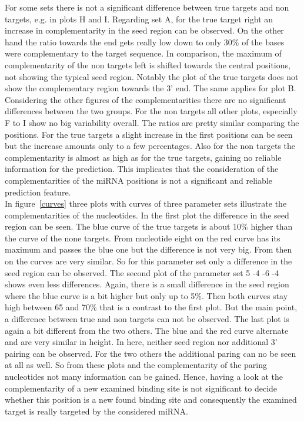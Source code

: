 \documentclass[12pt]{article}
\begin{document}
For some sets there is not a significant difference between true targets and non targets, e.g. in plots H and I. Regarding set A, for the true target right an increase in complementarity in the seed region can be observed. On the other hand the ratio towards the end gets really low down to only 30\% of the bases were complementary to the target sequence. In comparison, the maximum of complementarity of the non targets left is shifted towards the central positions, not showing the typical seed region. Notably the plot of the true targets does not show the complementary region towards the 3' end. The same applies for plot B. Considering the other figures of the complementarities there are no significant differences between the two groups. For the non targets all other plots, especially F to I show no big variability overall. The ratios are pretty similar comparing the positions. For the true targets a slight increase in the first positions can be seen but the increase amounts only to a few percentages.
Also for the non targets the complementarity is almost as high as for the true targets, gaining no reliable information for the prediction. This implicates that the consideration of the complementarities of the miRNA positions is not a significant and reliable prediction feature.\\

In figure~\ref{curves} three plots with curves of three parameter sets illustrate the complementarities of the nucleotides. In the first plot the difference in the seed region can be seen. The blue curve of the true targets is about 10\% higher than the curve of the none targets. From nucleotide eight on the red curve has its maximum and passes the blue one but the difference is not very big. From then on the curves are very similar. So for this parameter set only a difference in the seed region can be observed. 
The second plot of the parameter set 5 -4 -6 -4 shows even less differences. Again, there is a small difference in the seed region where the blue curve is a bit higher but only up to 5\%. Then both curves stay high between 65 and 70\% that is a contrast to the first plot. But the main point, a difference between true and non targets can not be observed.
The last plot is again a bit different from the two others. The blue and the red curve alternate and are very similar in height. In here, neither seed region nor additional 3' pairing can be observed. For the two others the additional paring can no be seen at all as well. So from these plots and the complementarity of the paring nucleotides not many information can be gained. Hence, having a look at the complementarity of a new examined binding site is not significant to decide whether this position is a new found binding site and consequently the examined target is really targeted by the considered miRNA.
\end{document}
